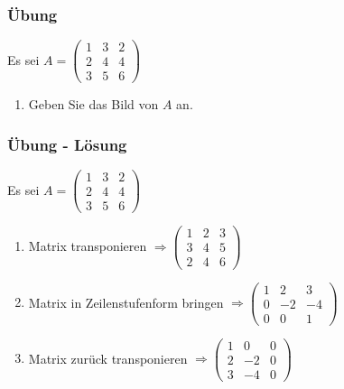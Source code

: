 \begin{frame}
    \frametitle{Übung}
	Es sei
    $A =
    \begin{pmatrix}
        1 & 3 & 2 \\
        2 & 4 & 4 \\
        3 & 5 & 6
    \end{pmatrix}$
    \begin{enumerate}
        \item Geben Sie das Bild von $A$ an.
    \end{enumerate}
\end{frame}

\begin{frame}
    \frametitle{Übung - Lösung}
	Es sei
    $A =
    \begin{pmatrix}
        1 & 3 & 2 \\
        2 & 4 & 4 \\
        3 & 5 & 6
    \end{pmatrix}$
    \begin{enumerate}
		\item Matrix transponieren $\Rightarrow
		\begin{pmatrix}
			1 & 2 & 3 \\
			3 & 4 & 5 \\
			2 & 4 & 6
		\end{pmatrix}$
		\item Matrix in Zeilenstufenform bringen $\Rightarrow
		\begin{pmatrix}
			1 & 2 & 3 \\
			0 & -2 & -4 \\
			0 & 0 & 1
		\end{pmatrix}$
		\item Matrix zurück transponieren $\Rightarrow
		\begin{pmatrix}
			1 & 0 & 0 \\
			2 & -2 & 0 \\
			3 & -4 & 0
		\end{pmatrix}$
    \end{enumerate}
\end{frame}

